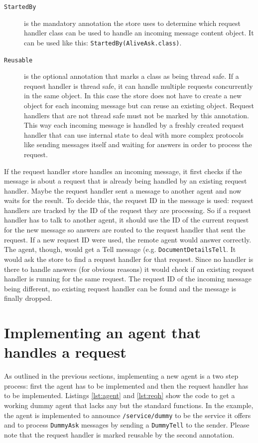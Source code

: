 \documentclass[12pt]{book}
\begin{document}
\begin{description}
\item[{\tt StartedBy}] is the mandatory annotation the store uses to determine which request handler class can be used to handle an incoming message content object. It can be used like this: {\tt StartedBy(AliveAsk.class)}.
\item[{\tt Reusable}] is the optional annotation that marks a class as being thread safe. If a request handler is thread safe, it can handle multiple requests concurrently in the same object. In this case the store does not have to create a new object for each incoming message but can reuse an existing object. Request handlers that are not thread safe must not be marked by this annotation. This way each incoming message is handled by a freshly created request handler that can use internal state to deal with more complex protocols like sending messages itself and waiting for answers in order to process the request.
\end{description}

If the request handler store handles an incoming message, it first checks if the message is about a request that is already being handled by an existing request handler. Maybe the request handler sent a message to another agent and now waits for the result. To decide this, the request ID in the message is used: request handlers are tracked by the ID of the request they are processing. So if a request handler has to talk to another agent, it should use the ID of the current request for the new message so answers are routed to the request handler that sent the request. If a new request ID were used, the remote agent would answer correctly. The agent, though, would get a Tell message (e.g. {\tt DocumentDetailsTell}. It would ask the store to find a request handler for that request. Since no handler is there to handle answers (for obvious reasons) it would check if an existing request handler is running for the same request. The request ID of the incoming message being different, no existing request handler can be found and the message is finally dropped.



\section{Implementing an agent that handles a request}

As outlined in the previous sections, implementing a new agent is a two step process: first the agent has to be implemented and then the request handler has to be implemented. Listings \ref{lst:agent} and \ref{lst:reqh} show the code to get a working dummy agent that lacks any but the standard functions. In the example, the agent is implemented to announce {\tt /service/dummy} to be the service it offers and to process {\tt DummyAsk} messages by sending a {\tt DummyTell} to the sender. Please note that the request handler is marked reusable by the second annotation.
\end{document}
